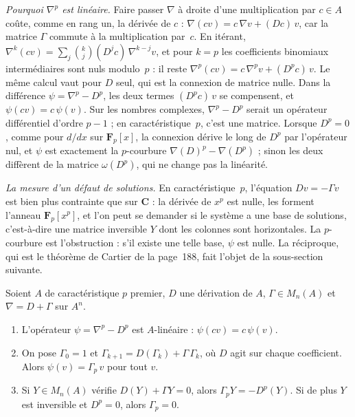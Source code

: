 \noindent\emph{Pourquoi $\nabla^p$ est linéaire.} Faire passer $\nabla$ à droite d'une multiplication par $c \in A$ coûte, comme en rang un, la dérivée de $c$ : $\nabla(cv) = c\,\nabla v + (Dc)\,v$, car la matrice $\Gamma$ commute à la multiplication par~$c$. En itérant, $\nabla^k(cv) = \sum_j \binom kj (D^j c)\,\nabla^{k-j} v$, et pour $k = p$ les coefficients binomiaux intermédiaires sont nuls modulo~$p$ : il reste $\nabla^p(cv) = c\,\nabla^p v + (D^p c)\,v$. Le même calcul vaut pour $D$ seul, qui est la connexion de matrice nulle. Dans la différence $\psi = \nabla^p - D^p$, les deux termes $(D^p c)\,v$ se compensent, et $\psi(cv) = c\,\psi(v)$. Sur les nombres complexes, $\nabla^p - D^p$ serait un opérateur différentiel d'ordre $p - 1$ ; en caractéristique~$p$, c'est une matrice. Lorsque $D^p = 0$, comme pour $d/dx$ sur $\mathbf F_p[x]$, la connexion dérive le long de $D^p$ par l'opérateur nul, et $\psi$ est exactement la $p$-courbure $\nabla(D)^p - \nabla(D^p)$ ; sinon les deux diffèrent de la matrice $\omega(D^p)$, qui ne change pas la linéarité.

\noindent\emph{La mesure d'un défaut de solutions.} En caractéristique~$p$, l'équation $Dv = -\Gamma v$ est bien plus contrainte que sur $\mathbf C$ : la dérivée de $x^p$ est nulle, les  forment l'anneau $\mathbf F_p[x^p]$, et l'on peut se demander si le système a une base de solutions, c'est-à-dire une matrice inversible $Y$ dont les colonnes sont horizontales. La $p$-courbure est l'obstruction : s'il existe une telle base, $\psi$ est nulle. La réciproque, qui est le théorème de Cartier de la page~188, fait l'objet de la sous-section suivante.

\begin{enonce}
Soient $A$ de caractéristique $p$ premier, $D$ une dérivation de $A$, $\Gamma \in M_n(A)$ et $\nabla = D + \Gamma$ sur $A^n$.
\begin{enumerate}
\item L'opérateur $\psi = \nabla^p - D^p$ est $A$-linéaire : $\psi(cv) = c\,\psi(v)$.
\item On pose $\Gamma_0 = 1$ et $\Gamma_{k+1} = D(\Gamma_k) + \Gamma\,\Gamma_k$, où $D$ agit sur chaque coefficient. Alors $\psi(v) = \Gamma_p\,v$ pour tout $v$.
\item Si $Y \in M_n(A)$ vérifie $D(Y) + \Gamma Y = 0$, alors $\Gamma_p Y = -D^p(Y)$. Si de plus $Y$ est inversible et $D^p = 0$, alors $\Gamma_p = 0$.
\end{enumerate}
\end{enonce}

